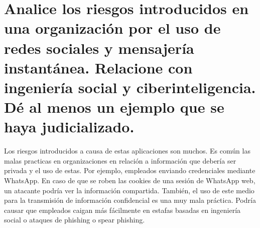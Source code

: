 \documentclass{article}
\begin{document}
	\section{Analice los riesgos introducidos en una organización por el uso de redes sociales y mensajería instantánea. Relacione con ingeniería social y ciberinteligencia. Dé al menos un ejemplo que se haya judicializado.}
	
	Los riesgos introducidos a causa de estas aplicaciones son muchos. Es común las malas practicas en organizaciones en relación a información que debería ser privada y el uso de estas. Por ejemplo, empleados enviando credenciales mediante WhatsApp. En caso de que se roben las cookies de una sesión de WhatsApp web, un atacante podría ver la información compartida.
	También, el uso de este medio para la transmisión de información confidencial es una muy mala práctica. Podría causar que empleados caigan más fácilmente en estafas basadas en ingeniería social o ataques de phishing o spear phishing. 
	
\end{document}
